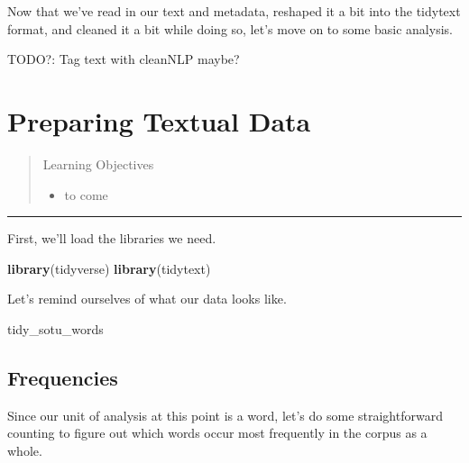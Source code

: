 \documentclass[]{book}
\newenvironment{Shaded}{\begin{snugshade}}{\end{snugshade}}
\newcommand{\DataTypeTok}[1]{\textcolor[rgb]{0.13,0.29,0.53}{#1}}
\newcommand{\KeywordTok}[1]{\textcolor[rgb]{0.13,0.29,0.53}{\textbf{#1}}}
\newcommand{\NormalTok}[1]{#1}
\newcommand{\OperatorTok}[1]{\textcolor[rgb]{0.81,0.36,0.00}{\textbf{#1}}}
\newcommand{\OtherTok}[1]{\textcolor[rgb]{0.56,0.35,0.01}{#1}}
\newcommand{\StringTok}[1]{\textcolor[rgb]{0.31,0.60,0.02}{#1}}
\providecommand{\tightlist}{%
  \setlength{\itemsep}{0pt}\setlength{\parskip}{0pt}}
\begin{document}
Now that we've read in our text and metadata, reshaped it a bit into the tidytext format, and cleaned it a bit while doing so, let's move on to some basic analysis.

TODO?: Tag text with cleanNLP maybe?

\hypertarget{textprep}{%
\chapter{Preparing Textual Data}\label{textprep}}

\begin{quote}
Learning Objectives

\begin{itemize}
\tightlist
\item
  to come
\end{itemize}
\end{quote}

\begin{center}\rule{0.5\linewidth}{\linethickness}\end{center}

First, we'll load the libraries we need.

\begin{Shaded}
\begin{Highlighting}[]
\KeywordTok{library}\NormalTok{(tidyverse)}
\KeywordTok{library}\NormalTok{(tidytext)}
\end{Highlighting}
\end{Shaded}

Let's remind ourselves of what our data looks like.

\begin{Shaded}
\begin{Highlighting}[]
\NormalTok{tidy_sotu_words}
\end{Highlighting}
\end{Shaded}

\hypertarget{frequencies}{%
\section{Frequencies}\label{frequencies}}

Since our unit of analysis at this point is a word, let's do some straightforward counting to figure out which words occur most frequently in the corpus as a whole.

\begin{Shaded}
\end{Shaded}
\end{document}
